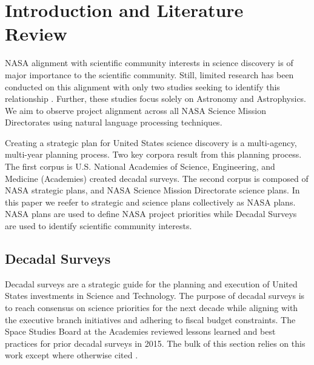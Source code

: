 \documentclass[preprint,12pt]{elsarticle}
\begin{document}


\section{Introduction and Literature Review}


NASA alignment with scientific community interests in science discovery is of major importance to the scientific community. Still, limited research has been conducted on this alignment with only two studies seeking to identify this relationship \cite{Trimble2011} \cite {pan2023seven_decadals}. Further, these studies focus solely on Astronomy and Astrophysics. We aim to observe project alignment across all NASA Science Mission Directorates using natural language processing techniques. 

Creating a strategic plan for United States science discovery is a multi-agency, multi-year planning process. Two key corpora result from this planning process. The first corpus is U.S. National Academies of Science, Engineering, and Medicine (Academies) created decadal surveys. The second corpus is composed of NASA strategic plans, and NASA Science Mission Directorate science plans. In this paper we reefer to strategic and science plans collectively as NASA plans. NASA plans are used to define NASA project priorities while Decadal Surveys are used to identify scientific community interests.

\subsection{Decadal Surveys}


Decadal surveys are a strategic guide for the planning and execution of United States investments in Science and Technology\cite{Academies2015_lessons}. The purpose of decadal surveys is to reach consensus on science priorities for the next decade while aligning with the executive branch initiatives and adhering to fiscal budget constraints. The Space Studies Board at the Academies reviewed lessons learned and best practices for prior decadal surveys in 2015. The bulk of this section relies on this work except where otherwise cited \cite{Academies2015_lessons}.
\end{document}
